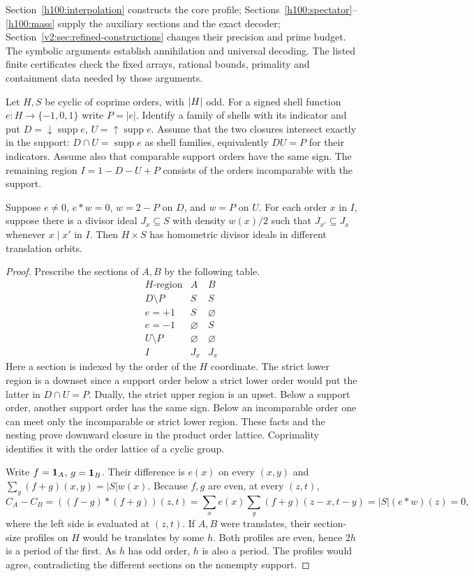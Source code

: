 Section~\ref{h100:interpolation} constructs the core profile;
Sections~\ref{h100:spectator}--\ref{h100:mass} supply the auxiliary
sections and the exact decoder; Section~\ref{v2:sec:refined-constructions}
changes their precision and prime budget. The symbolic arguments establish
annihilation and universal decoding. The listed finite certificates check
the fixed arrays, rational bounds, primality and containment data needed
by those arguments.

Let $H,S$ be cyclic of coprime orders, with $\lvert H\rvert$ odd. For a signed shell function $e:H\to\{-1,0,1\}$ write $P=|e|$. Identify a family of shells with its indicator and put $D=\downarrow\!\operatorname{supp} e$, $U=\uparrow\!\operatorname{supp} e$. Assume that the two closures intersect exactly in the support: $D\cap U=\operatorname{supp}e$ as shell families, equivalently $DU=P$ for their indicators. Assume also that comparable support orders have the same sign. The remaining region $I=1-D-U+P$ consists of the orders incomparable with the support.

\begin{lemma}\label{vi:lem:sections}
Suppose $e\ne0$, $e*w=0$, $w=2-P$ on $D$, and $w=P$ on $U$. For each order $x$ in $I$, suppose there is a divisor ideal $J_x\subseteq S$ with density $w(x)/2$ such that $J_{x'}\subseteq J_x$ whenever $x\mid x'$ in $I$. Then $H\times S$ has homometric divisor ideals in different translation orbits.
\end{lemma}
\begin{proof}
Prescribe the sections of $A,B$ by the following table.
\[
\begin{array}{c|cc}
 H\text{-region} & A & B\\ \hline
 D\setminus P&S&S\\ e=+1&S&\varnothing\\ e=-1&\varnothing&S\\
 U\setminus P&\varnothing&\varnothing\\ I&J_x&J_x
\end{array}
\]
Here a section is indexed by the order of the $H$ coordinate. The strict lower region is a downset since a support order below a strict lower order would put the latter in $D\cap U=P$. Dually, the strict upper region is an upset. Below a support order, another support order has the same sign. Below an incomparable order one can meet only the incomparable or strict lower region. These facts and the nesting prove downward closure in the product order lattice. Coprimality identifies it with the order lattice of a cyclic group.

Write $f=\mathbf1_A$, $g=\mathbf1_B$. Their difference is $e(x)$ on every $(x,y)$ and $\sum_y(f+g)(x,y)=|S|w(x)$. Because $f,g$ are even, at every $(z,t)$,
\[
 C_A-C_B=((f-g)*(f+g))(z,t)
 =\sum_x e(x)\sum_y(f+g)(z-x,t-y)=|S|(e*w)(z)=0,
\]
where the left side is evaluated at $(z,t)$. If $A,B$ were translates, their section-size profiles on $H$ would be translates by some $h$. Both profiles are even, hence $2h$ is a period of the first. As $h$ has odd order, $h$ is also a period. The profiles would agree, contradicting the different sections on the nonempty support.
\end{proof}

